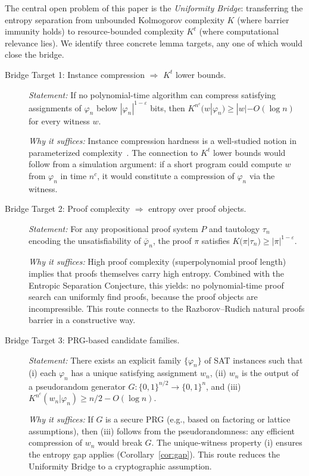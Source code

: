 \documentclass[aps,prd,twocolumn,superscriptaddress,nofootinbib]{revtex4-2}
\theoremstyle{definition}
\theoremstyle{remark}
\begin{document}
The central open problem of this paper is the \emph{Uniformity Bridge}: transferring the entropy separation from unbounded Kolmogorov complexity $K$ (where barrier immunity holds) to resource-bounded complexity $K^t$ (where computational relevance lies). We identify three concrete lemma targets, any one of which would close the bridge.

\begin{description}
\item[Bridge Target 1: Instance compression $\Rightarrow$ $K^t$ lower bounds.]
\emph{Statement:} If no polynomial-time algorithm can compress satisfying assignments of $\varphi_n$ below $|\varphi_n|^{1-\varepsilon}$ bits, then $K^{n^c}(w | \varphi_n) \geq |w| - O(\log n)$ for every witness $w$.

\emph{Why it suffices:} Instance compression hardness is a well-studied notion in parameterized complexity~\cite{FortnowSanthanam2011,DellMelkebeek2014}. The connection to $K^t$ lower bounds would follow from a simulation argument: if a short program could compute $w$ from $\varphi_n$ in time $n^c$, it would constitute a compression of $\varphi_n$ via the witness.

\item[Bridge Target 2: Proof complexity $\Rightarrow$ entropy over proof objects.]
\emph{Statement:} For any propositional proof system $P$ and tautology $\tau_n$ encoding the unsatisfiability of $\bar{\varphi}_n$, the proof $\pi$ satisfies $K(\pi | \tau_n) \geq |\pi|^{1-\varepsilon}$.

\emph{Why it suffices:} High proof complexity (superpolynomial proof length) implies that proofs themselves carry high entropy. Combined with the Entropic Separation Conjecture, this yields: no polynomial-time proof search can uniformly find proofs, because the proof objects are incompressible. This route connects to the Razborov--Rudich natural proofs barrier in a constructive way.

\item[Bridge Target 3: PRG-based candidate families.]
\emph{Statement:} There exists an explicit family $\{\varphi_n\}$ of SAT instances such that (i) each $\varphi_n$ has a unique satisfying assignment $w_n$, (ii) $w_n$ is the output of a pseudorandom generator $G: \{0,1\}^{n/2} \to \{0,1\}^n$, and (iii) $K^{n^c}(w_n | \varphi_n) \geq n/2 - O(\log n)$.

\emph{Why it suffices:} If $G$ is a secure PRG (e.g., based on factoring or lattice assumptions), then (iii) follows from the pseudorandomness: any efficient compression of $w_n$ would break $G$. The unique-witness property (i) ensures the entropy gap applies (Corollary~\ref{cor:gap}). This route reduces the Uniformity Bridge to a cryptographic assumption.
\end{description}
\end{document}
